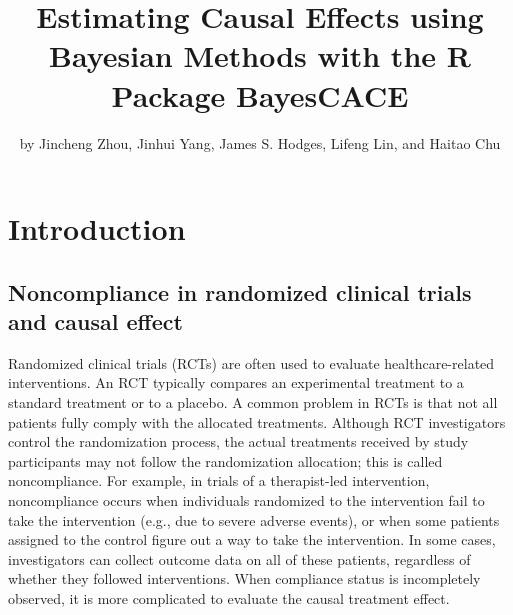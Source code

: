 \title{Estimating Causal Effects using Bayesian Methods with the R Package BayesCACE}


\author{by Jincheng Zhou, Jinhui Yang, James S. Hodges, Lifeng Lin, and Haitao Chu}

\maketitle


\hypertarget{introduction}{%
\section{Introduction}\label{introduction}}

\hypertarget{noncompliance-in-randomized-clinical-trials-and-causal-effect}{%
\subsection{Noncompliance in randomized clinical trials and causal effect}\label{noncompliance-in-randomized-clinical-trials-and-causal-effect}}

Randomized clinical trials (RCTs) are often used to evaluate healthcare-related interventions. An RCT typically compares an experimental treatment to a standard treatment or to a placebo. A common problem in RCTs is that not all patients fully comply with the allocated treatments. Although RCT investigators control the randomization process, the actual treatments received by study participants may not follow the randomization allocation; this is called noncompliance. For example, in trials of a therapist-led intervention, noncompliance occurs when individuals randomized to the intervention fail to take the intervention (e.g., due to severe adverse events), or when some patients assigned to the control figure out a way to take the intervention. In some cases, investigators can collect outcome data on all of these patients, regardless of whether they followed interventions. When compliance status is incompletely observed, it is more complicated to evaluate the causal treatment effect.

